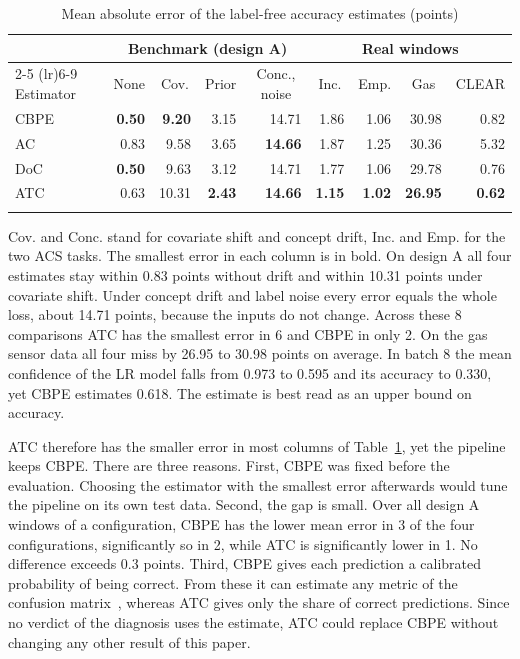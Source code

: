 \documentclass[pdflatex,referee,lineno,sn-basic]{sn-jnl}
\begin{document}
\begin{table}[!htbp]\centering\tablebodyfont
\caption{Mean absolute error of the label-free accuracy estimates (points)}\label{tab:estimators}%
\begin{tabular}{@{}lrrrrrrrr@{}}
\toprule
 & \multicolumn{4}{c}{Benchmark (design A)} & \multicolumn{4}{c}{Real windows} \\
\cmidrule(lr){2-5}
\cmidrule(lr){6-9}
Estimator & \multicolumn{1}{c}{None} & \multicolumn{1}{c}{Cov.} & \multicolumn{1}{c}{Prior} & \multicolumn{1}{c}{Conc., noise} & \multicolumn{1}{c}{Inc.} & \multicolumn{1}{c}{Emp.} & \multicolumn{1}{c}{Gas} & \multicolumn{1}{c}{CLEAR} \\
\midrule
CBPE & \textbf{0.50} & \textbf{9.20} & 3.15 & 14.71 & 1.86 & 1.06 & 30.98 & 0.82 \\
AC & 0.83 & 9.58 & 3.65 & \textbf{14.66} & 1.87 & 1.25 & 30.36 & 5.32 \\
DoC & \textbf{0.50} & 9.63 & 3.12 & 14.71 & 1.77 & 1.06 & 29.78 & 0.76 \\
ATC & 0.63 & 10.31 & \textbf{2.43} & \textbf{14.66} & \textbf{1.15} & \textbf{1.02} & \textbf{26.95} & \textbf{0.62} \\
\botrule
\end{tabular}
\end{table}

Cov. and Conc. stand for covariate shift and concept drift, Inc. and Emp. for the two ACS tasks. The smallest error in each column is in bold. On design A all four estimates stay within 0.83 points without drift and within 10.31 points under covariate shift. Under concept drift and label noise every error equals the whole loss, about 14.71 points, because the inputs do not change. Across these 8 comparisons ATC has the smallest error in 6 and CBPE in only 2. On the gas sensor data all four miss by 26.95 to 30.98 points on average. In batch 8 the mean confidence of the LR model falls from 0.973 to 0.595 and its accuracy to 0.330, yet CBPE estimates 0.618. The estimate is best read as an upper bound on accuracy.

ATC therefore has the smaller error in most columns of Table~\ref{tab:estimators}, yet the pipeline keeps CBPE. There are three reasons. First, CBPE was fixed before the evaluation. Choosing the estimator with the smallest error afterwards would tune the pipeline on its own test data. Second, the gap is small. Over all design A windows of a configuration, CBPE has the lower mean error in 3 of the four configurations, significantly so in 2, while ATC is significantly lower in 1. No difference exceeds 0.3 points. Third, CBPE gives each prediction a calibrated probability of being correct. From these it can estimate any metric of the confusion matrix~\citep{kivimaki2025performance}, whereas ATC gives only the share of correct predictions. Since no verdict of the diagnosis uses the estimate, ATC could replace CBPE without changing any other result of this paper.
\end{document}
